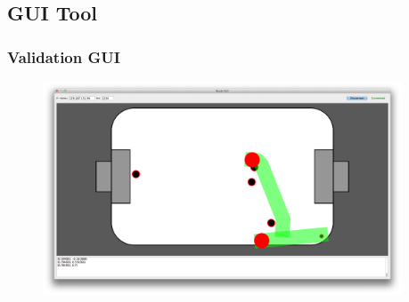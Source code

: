 \documentclass[hyperref={pdfpagelabels=false},compress]{beamer}
\begin{document}
%        

\subsection{GUI Tool}
\begin{frame}
    \frametitle{Validation GUI}
    \begin{figure}
        \center
        \includegraphics[width=0.95\textwidth]{Pictures/gui-big}
    \end{figure}

\end{frame}
\end{document}

